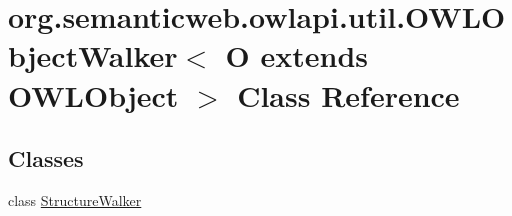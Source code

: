 \hypertarget{classorg_1_1semanticweb_1_1owlapi_1_1util_1_1_o_w_l_object_walker_3_01_o_01extends_01_o_w_l_object_01_4}{\section{org.\-semanticweb.\-owlapi.\-util.\-O\-W\-L\-Object\-Walker$<$ O extends O\-W\-L\-Object $>$ Class Reference}
\label{classorg_1_1semanticweb_1_1owlapi_1_1util_1_1_o_w_l_object_walker_3_01_o_01extends_01_o_w_l_object_01_4}
}
\subsection*{Classes}
\begin{DoxyCompactItemize}
\item 
class \hyperlink{classorg_1_1semanticweb_1_1owlapi_1_1util_1_1_o_w_l_object_walker_3_01_o_01extends_01_o_w_l_object_01_4_1_1_structure_walker}{Structure\-Walker}
\end{DoxyCompactItemize}
